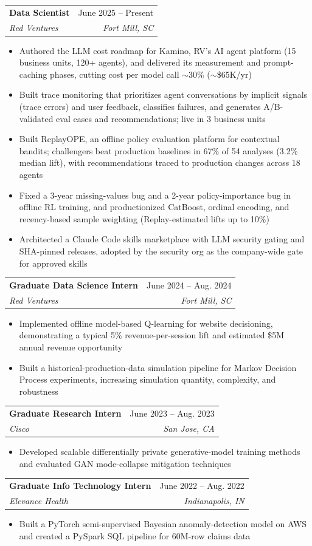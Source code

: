 \documentclass[letterpaper,11pt]{article}
\makeatletter
\newcommand{\resumeItem}[1]{
  \item\small{
    {#1 \vspace{-2pt}}
  }
}
\newcommand{\resumeSubheading}[4]{
  \vspace{-2pt}\item
    \begin{tabular*}{0.97\textwidth}[t]{l@{\extracolsep{\fill}}r}
      \textbf{#1} & #2 \\
      \textit{\small#3} & \textit{\small #4} \\
    \end{tabular*}\vspace{-7pt}
}
\newcommand{\resumeItemListStart}{\begin{itemize}}
\newcommand{\resumeItemListEnd}{\end{itemize}\vspace{-5pt}}
\makeatother
\begin{document}
  \resumeSubheading
    {Data Scientist}{June 2025 -- Present}
    {Red Ventures}{Fort Mill, SC}
    \resumeItemListStart
      \resumeItem{
          Authored the LLM cost roadmap for Kamino, RV's AI agent platform (15 business units, 120+ agents), and delivered its measurement and prompt-caching phases, cutting cost per model call $\sim$30\% ($\sim$\$65K/yr)
      }
      \resumeItem{
          Built trace monitoring that prioritizes agent conversations by implicit signals (trace errors) and user feedback, classifies failures, and generates A/B-validated eval cases and recommendations; live in 3 business units
      }
      \resumeItem{
          Built ReplayOPE, an offline policy evaluation platform for contextual bandits; challengers beat production baselines in 67\% of 54 analyses (3.2\% median lift), with recommendations traced to production changes across 18 agents
      }
      \resumeItem{
          Fixed a 3-year missing-values bug and a 2-year policy-importance bug in offline RL training, and productionized CatBoost, ordinal encoding, and recency-based sample weighting (Replay-estimated lifts up to 10\%)
      }
      \resumeItem{
          Architected a Claude Code skills marketplace with LLM security gating and SHA-pinned releases, adopted by the security org as the company-wide gate for approved skills
      }
    \resumeItemListEnd

  \resumeSubheading
    {Graduate Data Science Intern}{June 2024 -- Aug. 2024}
    {Red Ventures}{Fort Mill, SC}
    \resumeItemListStart
      \resumeItem{
          Implemented offline model-based Q-learning for website decisioning, demonstrating a typical 5\% revenue-per-session lift and estimated \$5M annual revenue opportunity
      }
      \resumeItem{
          Built a historical-production-data simulation pipeline for Markov Decision Process experiments, increasing simulation quantity, complexity, and robustness
      }
    \resumeItemListEnd

  \resumeSubheading
      {Graduate Research Intern}{June 2023 -- Aug. 2023}
      {Cisco}{San Jose, CA}
      \resumeItemListStart
          \resumeItem{
              Developed scalable differentially private generative-model training methods and evaluated GAN mode-collapse mitigation techniques
          }
      \resumeItemListEnd

  \resumeSubheading
    {Graduate Info Technology Intern}{June 2022 -- Aug. 2022}
    {Elevance Health}{Indianapolis, IN}
    \resumeItemListStart
        \resumeItem{
            Built a PyTorch semi-supervised Bayesian anomaly-detection model on AWS and created a PySpark SQL pipeline for 60M-row claims data
        }
    \resumeItemListEnd    %
\end{document}

